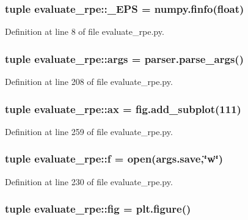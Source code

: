 \subsubsection[{\-\_\-\-E\-P\-S}]{\setlength{\rightskip}{0pt plus 5cm}tuple {\bf evaluate\-\_\-rpe\-::\-\_\-\-E\-P\-S} = numpy.\-finfo(float)}\label{namespaceevaluate__rpe_ae2f9a1d1fa0fc3e16409f219877d8f3f}


\-Definition at line 8 of file evaluate\-\_\-rpe.\-py.

\subsubsection[{args}]{\setlength{\rightskip}{0pt plus 5cm}tuple {\bf evaluate\-\_\-rpe\-::args} = parser.\-parse\-\_\-args()}\label{namespaceevaluate__rpe_a56386c6923153a0b54fd0ad08f6f65c5}


\-Definition at line 208 of file evaluate\-\_\-rpe.\-py.

\subsubsection[{ax}]{\setlength{\rightskip}{0pt plus 5cm}tuple {\bf evaluate\-\_\-rpe\-::ax} = fig.\-add\-\_\-subplot(111)}\label{namespaceevaluate__rpe_acec35b582c8cf510ceb59cf453886e5f}


\-Definition at line 259 of file evaluate\-\_\-rpe.\-py.

\subsubsection[{f}]{\setlength{\rightskip}{0pt plus 5cm}tuple {\bf evaluate\-\_\-rpe\-::f} = open(args.\-save,\char`\"{}w\char`\"{})}\label{namespaceevaluate__rpe_ac861fec3070585727296cd81c3f2bfce}


\-Definition at line 230 of file evaluate\-\_\-rpe.\-py.

\subsubsection[{fig}]{\setlength{\rightskip}{0pt plus 5cm}tuple {\bf evaluate\-\_\-rpe\-::fig} = plt.\-figure()}\label{namespaceevaluate__rpe_a83d8d36e0070f6ae0208a1c34e66aa5a}


